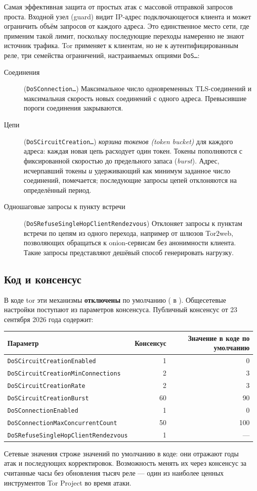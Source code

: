 Самая эффективная защита от простых атак с массовой отправкой запросов проста. Входной узел (guard) видит IP-адрес подключающегося клиента и может ограничить объём запросов от каждого адреса. Это единственное место сети, где применим такой лимит, поскольку последующие переходы намеренно не знают источник трафика. Tor применяет к клиентам, но не к аутентифицированным реле, три семейства ограничений, настраиваемых опциями \texttt{DoS\ldots}:
\begin{description}
  \item[Соединения] (\texttt{DoSConnection\ldots}) Максимальное число одновременных TLS-соединений и максимальная скорость новых соединений с одного адреса. Превысившие пороги соединения закрываются.
  \item[Цепи] (\texttt{DoSCircuitCreation\ldots}) \emph{корзина токенов (token bucket)} для каждого адреса: каждая новая цепь расходует один токен. Токены пополняются с фиксированной скоростью до предельного запаса (\emph{burst}). Адрес, исчерпавший токены \emph{и} удерживающий как минимум заданное число соединений, помечается; последующие запросы цепей отклоняются на определённый период.
  \item[Одношаговые запросы к пункту встречи] (\texttt{DoSRefuseSingleHopClientRendezvous}) Отклоняет запросы к пунктам встречи по цепям из одного перехода, например от шлюзов Tor2web, позволяющих обращаться к onion-сервисам без анонимности клиента. Такие запросы представляют дешёвый способ генерировать нагрузку.
\end{description}

\subsection{Код и консенсус}

В коде tor эти механизмы \textbf{отключены} по умолчанию ( в ). Общесетевые настройки поступают из параметров консенсуса. Публичный консенсус от 23 сентября 2026 года содержит:
\begin{center}\small
\begin{tabular}{lrr}
\toprule
Параметр & Консенсус & Значение в коде по умолчанию \\
\midrule
\texttt{DoSCircuitCreationEnabled} & 1 & 0 \\
\texttt{DoSCircuitCreationMinConnections} & 2 & 3 \\
\texttt{DoSCircuitCreationRate} & 2 & 3 \\
\texttt{DoSCircuitCreationBurst} & 60 & 90 \\
\texttt{DoSConnectionEnabled} & 1 & 0 \\
\texttt{DoSConnectionMaxConcurrentCount} & 50 & 100 \\
\texttt{DoSRefuseSingleHopClientRendezvous} & 1 & --- \\
\bottomrule
\end{tabular}
\end{center}
Сетевые значения строже значений по умолчанию в коде: они отражают годы атак и последующих корректировок. Возможность менять их через консенсус за считанные часы без обновления тысяч реле --- один из наиболее ценных инструментов Tor Project во время атаки.

